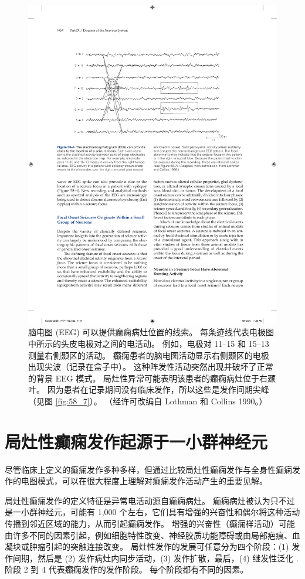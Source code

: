 \begin{figure}[htbp]
	\centering
	\includegraphics[width=0.8\linewidth]{chap58/fig_58_4}
	\caption{脑电图 (EEG) 可以提供癫痫病灶位置的线索。 每条迹线代表电极图中所示的头皮电极对之间的电活动。 例如，电极对 11–15 和 15–13 测量右侧颞区的活动。 癫痫患者的脑电图活动显示右侧颞区的电极出现尖波（记录在盒子中）。 这种阵发性活动突然出现并破坏了正常的背景 EEG 模式。 局灶性异常可能表明该患者的癫痫病灶位于右颞叶。 因为患者在记录期间没有临床发作，所以这些是发作间期尖峰（见图 \ref{fig:58_7}）。 （经许可改编自 Lothman 和 Collins 1990。）}
	\label{fig:58_4}
\end{figure}


\section{局灶性癫痫发作起源于一小群神经元}
尽管临床上定义的癫痫发作多种多样，但通过比较局灶性癫痫发作与全身性癫痫发作的电图模式，可以在很大程度上理解对癫痫发作活动产生的重要见解。

局灶性癫痫发作的定义特征是异常电活动源自癫痫病灶。 癫痫病灶被认为只不过是一小群神经元，可能有 1,000 个左右，它们具有增强的兴奋性和偶尔将这种活动传播到邻近区域的能力，从而引起癫痫发作。 增强的兴奋性（癫痫样活动）可能由许多不同的因素引起，例如细胞特性改变、神经胶质功能障碍或由局部疤痕、血凝块或肿瘤引起的突触连接改变。 局灶性发作的发展可任意分为四个阶段：(1) 发作间期，然后是 (2) 发作病灶内同步活动，(3) 发作扩散，最后，(4) 继发性泛化 . 阶段 2 到 4 代表癫痫发作的发作阶段。 每个阶段都有不同的因素。

